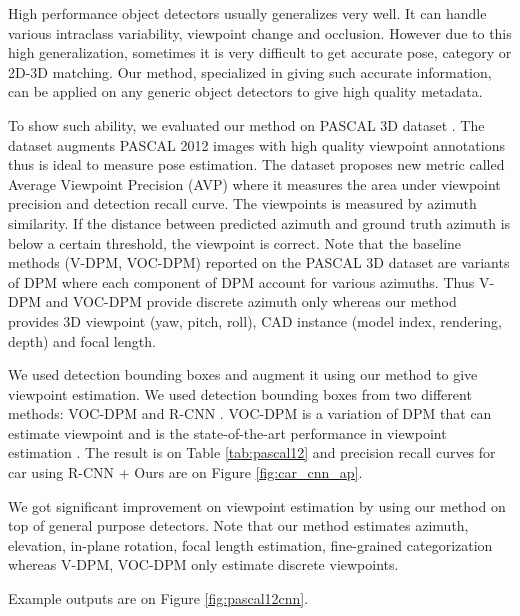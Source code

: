\documentclass[10pt,twocolumn,letterpaper]{article}
\begin{document}
High performance object detectors usually generalizes very well. It can handle various intraclass variability, viewpoint change and occlusion. However due to this high generalization, sometimes it is very difficult to get accurate pose, category or 2D-3D matching. Our method, specialized in giving such accurate information, can be applied on any generic object detectors to give high quality metadata.

To show such ability, we evaluated our method on PASCAL 3D dataset \cite{Xiang14}. The dataset augments PASCAL 2012 images with high quality viewpoint annotations thus is ideal to measure pose estimation. The dataset proposes new metric called Average Viewpoint Precision (AVP) where it measures the area under viewpoint precision and detection recall curve. The viewpoints is measured by azimuth similarity. If the distance between predicted azimuth and ground truth azimuth is below a certain threshold, the viewpoint is correct. Note that the baseline methods (V-DPM, VOC-DPM) reported on the PASCAL 3D dataset are variants of DPM where each component of DPM account for various azimuths. Thus V-DPM and VOC-DPM provide discrete azimuth only whereas our method provides 3D viewpoint (yaw, pitch, roll), CAD instance (model index, rendering, depth) and focal length.

We used detection bounding boxes and augment it using our method to give viewpoint estimation. We used detection bounding boxes from two different methods: VOC-DPM \cite{Pepik12} and R-CNN \cite{Girshick14}. VOC-DPM is a variation of DPM that can estimate viewpoint and is the state-of-the-art performance in viewpoint estimation \cite{Xiang14}. The result is on Table \ref{tab:pascal12} and precision recall curves for car using R-CNN + Ours are on Figure \ref{fig:car_cnn_ap}. 

We got significant improvement on viewpoint estimation by using our method on top of general purpose detectors. Note that our method estimates azimuth, elevation, in-plane rotation, focal length estimation, fine-grained categorization whereas V-DPM, VOC-DPM only estimate discrete viewpoints.

Example outputs are on Figure \ref{fig:pascal12cnn}.
\end{document}
